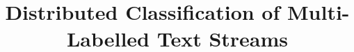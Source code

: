 \documentclass[sigconf]{acmart}
\theoremstyle{remark}
\begin{document}

\title {Distributed Classification of Multi-Labelled Text Streams}

\end{document}
